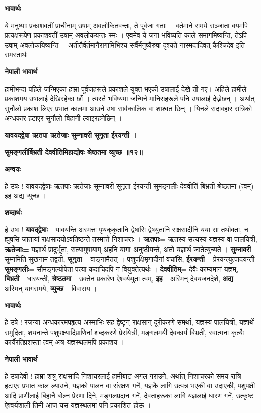 \documentclass[11pt, a5paper]{article}
\begin{document}
\textbf{भावार्थः}

ये मनुष्याः प्रकाशवतीं प्राचीनाम् उषाम् अवलोकितवन्तः, ते पूर्वजा गताः । वर्तमाने समये सञ्जाता वयमपि प्रत्यक्षरूपेण प्रकाशवतीं उषाम् अवलोकयन्तः स्मः । एवमेव ये जना भविष्यति काले समागमिष्यन्ति, तेऽपि उषाम् अवलोकयिष्यन्ति । अतीतैर्वर्तमानैरागामिभिश्च सर्वैर्मनुष्यैरुषा दृश्यते नास्मदादिवत् कैश्चिदेव इति समस्तार्थः ।

\textbf{नेपाली भावार्थ}

हामीभन्दा पहिले जन्मिएका हाम्रा पूर्वजहरूले प्रकाशले युक्त भएकी उषालाई देखे ती गए। अहिले हामीले प्रकाशमय उषालाई देखिरहेका छौं । त्यस्तै भविष्यमा जन्मिने मानिसहरूले पनि उषालाई देख्नेछन् । अर्थात् सुनौलो प्रकाश लिएर प्रभात कालमा आउने उषा सार्वकालिक वा शाश्वत छिन् । यिनले सदावहार रात्रिको अन्धकार हटाएर सुनौलो बिहानी ल्याइरहनेछिन् ।

\textbf{यावयद्‌द्वेषा ऋतपा ऋतेजाः सुम्नावरी सूनृता ईरयन्ती ।}

\textbf{सुमङ्गलीर्बिभ्रती देववीतिमिहाद्योषः श्रेष्ठतमा व्युच्छ ॥१२॥}

\textbf{अन्वयः}

हे उषः ! यावयद्‌द्वेषाः ऋतपाः ऋतेजाः सूम्नावरी सूनृता ईरयन्ती सुमङ्गलीः देववीतिं बिभ्रती श्रेष्ठतमा (त्वम्) इह अद्य व्युच्छ ।

\textbf{शब्दार्थः}

हे उषः ! \textbf{यावद्‌द्वेषाः}= यावयन्ति अस्मत्तः पृथक्‌कृतानि द्वेषांसि द्वेषयुतानि राक्षसादीनि यया सा तथोक्ता, न ह्युषसि जातायां राक्षसादयोऽवतिष्ठन्ते तस्मात्ते निशाचराः । \textbf{ऋतपाः}= ऋतस्य सत्यस्य यज्ञस्य वा पालयित्री, \textbf{ऋतेजाः=} यज्ञार्थं प्रादुर्भूता, सत्यामुषायाम् अहनि यागा अनुष्ठीयन्ते, अतो यज्ञार्थं जातेत्युच्यते । \textbf{सुम्नावरी}= सुम्नमिति सुखनाम तद्वती, \textbf{सूनृता=} वाङ्‌नामैतत् । पशुपक्षिमृगादीनां वचांसि, \textbf{ईरयन्ती=} प्रेरयन्त्युत्पादयन्ती \textbf{सुमङ्गलीः}= सौमङ्गल्योपेता पत्या कदाचिदपि न वियुक्तेत्यर्थः । \textbf{देववीतिम्}= देवैः काम्यमानं यज्ञम्, \textbf{बिभ्रती}= धारयन्ती, \textbf{श्रेष्ठतमा}= उक्तेन प्रकारेण ऐश्वर्ययुता त्वम्, \textbf{इह}= अस्मिन् देवयजनदेशे, \textbf{अद्य}= अस्मिन् यागसमये, \textbf{व्युच्छ}= विवासय ।

\textbf{भावार्थः}

हे उषे ! रजन्या अन्धकारमपहृत्य अस्माभिः सह द्वेष्टॄन् राक्षसान् दूरीकरणे समर्था, यज्ञस्य पालयित्री, यज्ञार्थे समुदिता, शयनान्ते पशुपक्ष्यादिप्राणिनां शब्दकरणे प्रेरयित्री, मङ्गलमयी देवकार्यं बिभ्रती, स्वात्मना कृत्यैः कार्यैरतिप्रशस्ता त्वम् अत्र यज्ञस्थलमपि प्रकाशय ।

\textbf{नेपाली भावार्थ}

हे उषादेवी ! हाम्रा शत्रु राक्षसादि निशाचरलाई हामीबाट अगल गराउने, अर्थात् निशाचरको समय रात्रि हटाएर प्रभात काल ल्याउने, यज्ञको पालन वा संरक्षण गर्ने, यज्ञकै लागि उत्पन्न भएकी वा उदाएकी, पशुपक्षी आदि प्राणीलाई बिहानै बोल्न प्रेरणा दिने, मङ्गलप्रदान गर्ने, देवताहरूका लागि यज्ञलाई धारण गर्ने, उत्कृष्ट ऐश्वर्यशाली तिमी आज यस यज्ञस्थलमा पनि प्रकाशित होऊ ।
\end{document}
